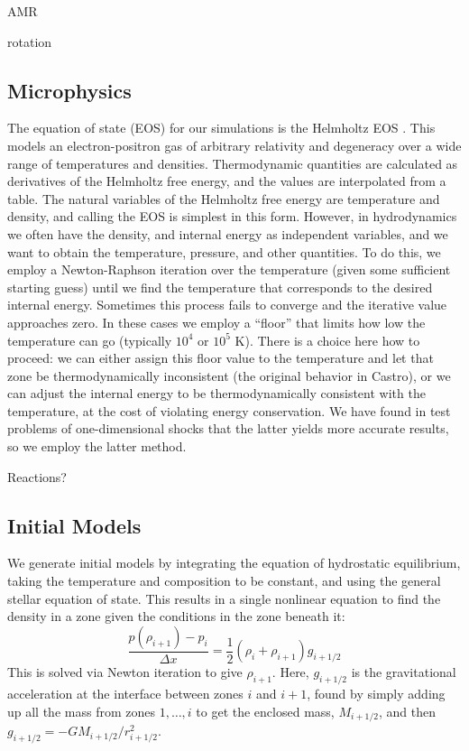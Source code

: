 \documentclass[12pt,preprint]{aastex}
\begin{document}
AMR

rotation


\subsection{Microphysics}

The equation of state (EOS) for our simulations is the Helmholtz EOS \citep{timmes_swesty:2000}. This models an electron-positron gas of arbitrary relativity and degeneracy over a wide range of temperatures and densities. Thermodynamic quantities are calculated as derivatives of the Helmholtz free energy, and the values are interpolated from a table. The natural variables of the Helmholtz free energy are temperature and density, and calling the EOS is simplest in this form. However, in hydrodynamics we often have the density, and internal energy as independent variables, and we want to obtain the temperature, pressure, and other quantities. To do this, we employ a Newton-Raphson iteration over the temperature (given some sufficient starting guess) until we find the temperature that corresponds to the desired internal energy. Sometimes this process fails to converge and the iterative value approaches zero. In these cases we employ a ``floor'' that limits how low the temperature can go (typically $10^4$ or $10^5$ K). There is a choice here how to proceed: we can either assign this floor value to the temperature and let that zone be thermodynamically inconsistent (the original behavior in Castro), or we can adjust the internal energy to be thermodynamically consistent with the temperature, at the cost of violating energy conservation. We have found in test problems of one-dimensional shocks that the latter yields more accurate results, so we employ the latter method.

Reactions?

\subsection{Initial Models}
\label{sec:initial_models}

We generate initial models by integrating the equation of hydrostatic
equilibrium, taking the temperature and composition to be constant,
and using the general stellar equation of state.  This results in
a single nonlinear equation to find the density in a zone given the
conditions in the zone beneath it:
\begin{equation}
\frac{p(\rho_{i+1}) - p_i}{\Delta x} = \frac{1}{2} (\rho_i + \rho_{i+1}) g_{i+1/2}
\end{equation}
This is solved via Newton iteration to give $\rho_{i+1}$.  Here, $g_{i+1/2}$
is the gravitational acceleration at the interface between zones $i$ and $i+1$,
found by simply adding up all the mass from zones $1, \ldots, i$ to get the
enclosed mass, $M_{i+1/2}$, and then $g_{i+1/2} = -GM_{i+1/2}/r_{i+1/2}^2$.
\end{document}

